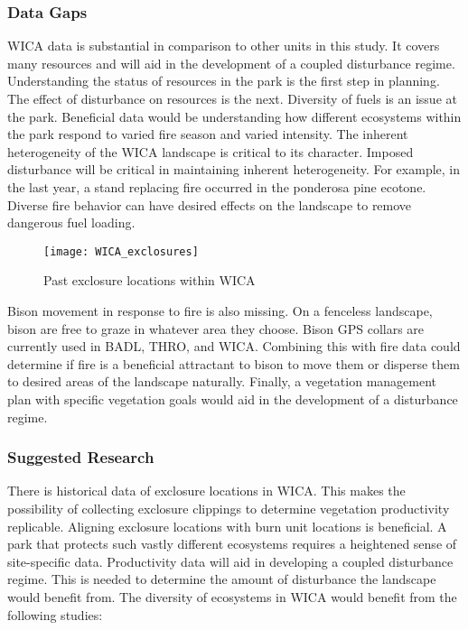 \subsubsection{Data Gaps}

WICA data is substantial in comparison to other units in this study. It
covers many resources and will aid in the development of a coupled
disturbance regime. Understanding the status of resources in the park is
the first step in planning. The effect of disturbance on resources is
the next. Diversity of fuels is an issue at the park. Beneficial data
would be understanding how different ecosystems within the park respond
to varied fire season and varied intensity. The inherent heterogeneity
of the WICA landscape is critical to its character. Imposed disturbance
will be critical in maintaining inherent heterogeneity. For example, in
the last year, a stand replacing fire occurred in the ponderosa pine
ecotone. Diverse fire behavior can have desired effects on the landscape
to remove dangerous fuel loading.

\begin{figure} 
\texttt{[image: WICA\_exclosures]}
\caption{Past exclosure locations within WICA}
\label{fig:WICAexclosures}
\end{figure}

Bison movement in response to fire is also missing. On a fenceless
landscape, bison are free to graze in whatever area they choose. Bison
GPS collars are currently used in BADL, THRO, and WICA. Combining this
with fire data could determine if fire is a beneficial attractant to
bison to move them or disperse them to desired areas of the landscape
naturally. Finally, a vegetation management plan with specific
vegetation goals would aid in the development of a disturbance regime.

\subsubsection{Suggested Research}

There is historical data of exclosure locations in WICA. This makes the
possibility of collecting exclosure clippings to determine vegetation
productivity replicable. Aligning exclosure locations with burn unit
locations is beneficial. A park that protects such vastly different
ecosystems requires a heightened sense of site-specific data.
Productivity data will aid in developing a coupled disturbance regime.
This is needed to determine the amount of disturbance the landscape
would benefit from. The diversity of ecosystems in WICA would benefit
from the following studies:

